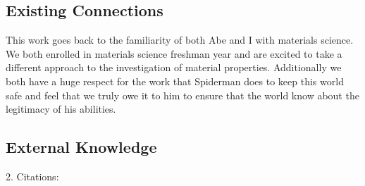 \subsection{Existing Connections}
This work goes back to the familiarity of both Abe and I with materials science. We both enrolled in materials science freshman year and are excited to take a different approach to the investigation of material properties. Additionally we both have a huge respect for the work that Spiderman does to keep this world safe and feel that we truly owe it to him to ensure that the world know about the legitimacy of his abilities.

\subsection{External Knowledge}
2. Citations:

